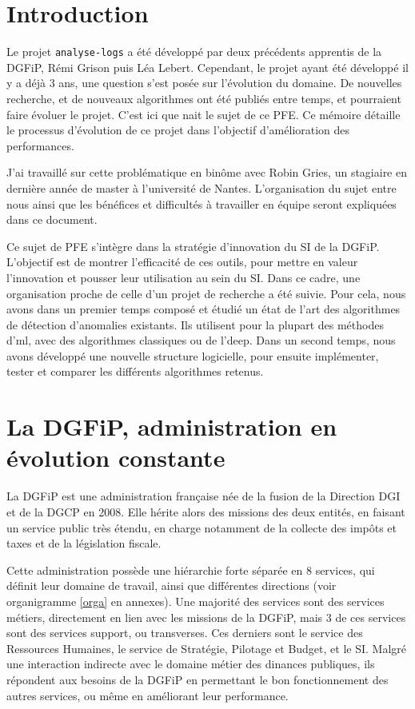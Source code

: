 \documentclass[openany, 11pt]{memoir}
\newcommand\chapters[1]{
	\chapter*{#1}
	\addcontentsline{toc}{chapter}{#1}
}
\begin{document}
\mainmatter
\pagestyle{fancy}
\glsresetall
\chapters{Introduction}

Le projet \texttt{analyse-logs} a été développé par deux précédents apprentis de la \gls{DGFiP}, Rémi Grison puis Léa Lebert. Cependant, le projet ayant été développé il y a déjà 3 ans, une question s'est posée sur l'évolution du domaine. De nouvelles recherche, et de nouveaux algorithmes ont été publiés entre temps, et pourraient faire évoluer le projet. C'est ici que nait le sujet de ce PFE. Ce mémoire détaille le processus d'évolution de ce projet dans l'objectif d'amélioration des performances.

\bigskip
J'ai travaillé sur cette problématique en binôme avec Robin Gries, un stagiaire en dernière année de master à l'université de Nantes. L'organisation du sujet entre nous ainsi que les bénéfices et difficultés à travailler en équipe seront expliquées dans ce document.

\bigskip
Ce sujet de PFE s'intègre dans la stratégie d'innovation du \gls{SI} de la \gls{DGFiP}. L'objectif est de montrer l'efficacité de ces outils, pour mettre en valeur l'innovation et pousser leur utilisation au sein du \gls{SI}. Dans ce cadre, une organisation proche de celle d'un projet de recherche a été suivie. Pour cela, nous avons dans un premier temps composé et étudié un état de l'art des algorithmes de détection d'anomalies existants. Ils utilisent pour la plupart des méthodes d'\gls{ml}, avec des algorithmes classiques ou de l'\gls{deep}. Dans un second temps, nous avons développé une nouvelle structure logicielle, pour ensuite implémenter, tester et comparer les différents algorithmes retenus.

\newpage
\chapter{La DGFiP, administration en évolution constante}
\label{dgfip}
La \gls{DGFiP} est une administration française née de la fusion de la Direction \gls{DGI} et de la \gls{DGCP} en 2008. Elle hérite alors des missions des deux entités, en faisant un service public très étendu, en charge notamment de la collecte des impôts et taxes et de la législation fiscale. 

Cette administration possède une hiérarchie forte séparée en 8 services, qui définit leur domaine de travail, ainsi que différentes directions (voir organigramme \ref{orga} en annexes). Une majorité des services sont des services métiers, directement en lien avec les missions de la \gls{DGFiP}, mais 3 de ces services sont des services support, ou \glspl{transverse}. Ces derniers sont le service des Ressources Humaines, le service de Stratégie, Pilotage et Budget, et le \gls{SI}. Malgré une interaction indirecte avec le domaine métier des dinances publiques, ils répondent aux besoins de la \gls{DGFiP} en permettant le bon fonctionnement des autres services, ou même en améliorant leur performance.
\end{document}

